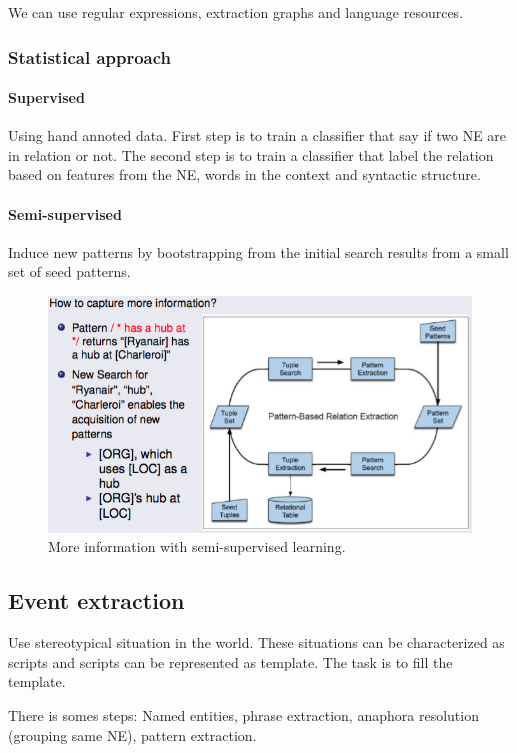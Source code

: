 We can use regular expressions, extraction  graphs and language resources.

\subsubsection{Statistical approach}

\paragraph{Supervised}

Using hand annoted data. First step is to train a classifier that say if two NE are in relation or not. The second step is to train a classifier that label the relation based on features from the NE, words in the context and syntactic structure.

\paragraph{Semi-supervised}

Induce new patterns by bootstrapping from the initial search results from a small set of seed patterns.

\begin{figure}[htp]
	\centering
	\includegraphics[scale=0.5]{images/70_example.png}
 	\caption{More information with semi-supervised learning.}
\end{figure}

\subsection{Event extraction}

Use stereotypical situation in the world. These situations can be characterized as scripts and scripts can be represented as template. The task is to fill the template.

There is somes steps: Named entities, phrase extraction, anaphora resolution (grouping same NE), pattern extraction.
